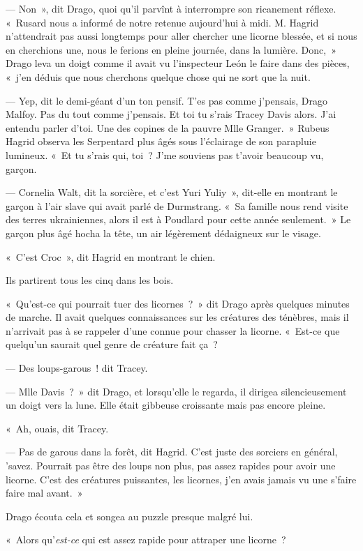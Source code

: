 --- Non~», dit Drago, quoi qu'il parvînt à interrompre son ricanement réflexe. «~Rusard nous a informé de notre retenue aujourd'hui à midi. M. Hagrid n'attendrait pas aussi longtemps pour aller chercher une licorne blessée, et si nous en cherchions une, nous le ferions en pleine journée, dans la lumière. Donc,~» Drago leva un doigt comme il avait vu l'inspecteur León le faire dans des pièces, «~j'en déduis que nous cherchons quelque chose qui ne sort que la nuit.

--- Yep, dit le demi-géant d'un ton pensif. T'es pas comme j'pensais, Drago Malfoy. Pas du tout comme j'pensais. Et toi tu s'rais Tracey Davis alors. J'ai entendu parler d'toi. Une des copines de la pauvre Mlle Granger.~» Rubeus Hagrid observa les Serpentard plus âgés sous l'éclairage de son parapluie lumineux. «~Et tu s'rais qui, toi~? J'me souviens pas t'avoir beaucoup vu, garçon.

--- Cornelia Walt, dit la sorcière, et c'est Yuri Yuliy~», dit-elle en montrant le garçon à l'air slave qui avait parlé de Durmstrang. «~Sa famille nous rend visite des terres ukrainiennes, alors il est à Poudlard pour cette année seulement.~» Le garçon plus âgé hocha la tête, un air légèrement dédaigneux sur le visage.

«~C'est Croc~», dit Hagrid en montrant le chien.

Ils partirent tous les cinq dans les bois.

«~Qu'est-ce qui pourrait tuer des licornes~?~» dit Drago après quelques minutes de marche. Il avait quelques connaissances sur les créatures des ténèbres, mais il n'arrivait pas à se rappeler d'une connue pour chasser la licorne. «~Est-ce que quelqu'un saurait quel genre de créature fait ça~?

--- Des loups-garous~! dit Tracey.

--- Mlle Davis~?~» dit Drago, et lorsqu'elle le regarda, il dirigea silencieusement un doigt vers la lune. Elle était gibbeuse croissante mais pas encore pleine.

«~Ah, ouais, dit Tracey.

--- Pas de garous dans la forêt, dit Hagrid. C'est juste des sorciers en général, 'savez. Pourrait pas être des loups non plus, pas assez rapides pour avoir une licorne. C'est des créatures puissantes, les licornes, j'en avais jamais vu une s'faire faire mal avant.~»

Drago écouta cela et songea au puzzle presque malgré lui.

«~Alors qu'\emph{est-ce} qui est assez rapide pour attraper une licorne~?

